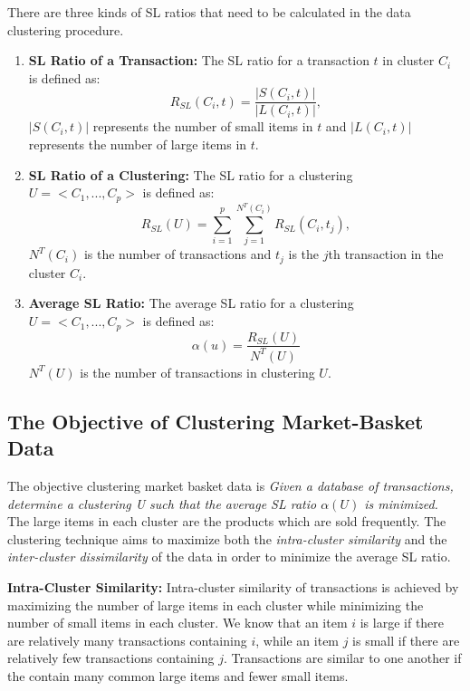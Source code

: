 \documentclass[11pt,reqno]{amsart}
\theoremstyle{definition}
\numberwithin{equation}{subsection}
\begin{document}
There are three kinds of SL ratios that need to be calculated in the data clustering procedure.
	\begin{enumerate}


	\item \textbf{SL Ratio of a Transaction:} The SL ratio for a transaction $t$ in cluster $C_i$ is defined as:
	$$R_{SL}(C_i, t) = \frac{|S(C_i,t)|}{|L(C_i, t)|} ,$$
$|S(C_i,t)|$ represents the number of small items in $t$ and $|L(C_i,t)|$ represents the number of large items in $t$.


	\item \textbf{SL Ratio of a Clustering:} The SL ratio for a clustering $U = <C_1, ..., C_p>$ is defined as:
	$$R_{SL}(U) = \sum_{i=1}^{p} \sum_{j=1}^{N^T(C_i)} R_{SL}(C_i, t_j), $$
	$N^T(C_i)$ is the number of transactions and $t_j$ is the $j$th transaction in the cluster $C_i$. 
	
	
	
	\item \textbf{Average SL Ratio:} The average SL ratio for a clustering $U =<C_1, ..., C_p>$ is defined as:
	$$\alpha(u) = \frac{R_{SL}(U)}{N^T(U)}$$
	$N^T(U)$ is the number of transactions in clustering $U$.
	
	\end{enumerate}

\subsection{The Objective of Clustering Market-Basket Data}

The objective clustering market basket data is {\em Given a database of transactions, determine a clustering U such that the average SL ratio $\alpha(U)$ is minimized.} The large items in each cluster are the products which are sold frequently. The clustering technique aims to maximize both the {\em intra-cluster similarity} and the {\em inter-cluster dissimilarity} of the data in order to minimize the average SL ratio. 

\textbf{Intra-Cluster Similarity:} Intra-cluster similarity of transactions is achieved by maximizing the number of large items in each cluster while minimizing the number of small items in each cluster. We know that an item $i$ is large if there are relatively many transactions containing $i$, while an item $j$ is small if there are relatively few transactions containing $j$. Transactions are similar to one another if the contain many common large items and fewer small items. 
\end{document}
